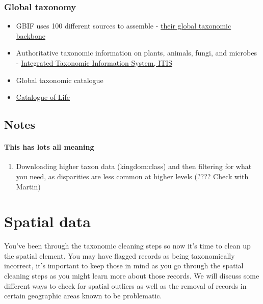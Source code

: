 \documentclass[
  letterpaper,
  DIV=11,
  numbers=noendperiod,
  oneside]{scrreprt}
\providecommand{\tightlist}{%
  \setlength{\itemsep}{0pt}\setlength{\parskip}{0pt}}\usepackage{longtable,booktabs,array}
\begin{document}
\hypertarget{global-taxonomy}{%
\subsection{Global taxonomy}\label{global-taxonomy}}

\begin{itemize}
\item
  GBIF uses 100 different sources to assemble -
  \href{https://www.gbif.org/dataset/d7dddbf4-2cf0-4f39-9b2a-bb099caae36c}{their
  global taxonomic backbone}
\item
  Authoritative taxonomic information on plants, animals, fungi, and
  microbes - \href{https://www.itis.gov/}{Integrated Taxonomic
  Information System, ITIS}
\item
  Global taxonomic catalogue
\item
  \href{https://www.catalogueoflife.org/}{Catalogue of Life}
\end{itemize}

\hypertarget{notes}{%
\section{Notes}\label{notes}}

\hypertarget{this-has-lots-all-meaning}{%
\subsubsection{This has lots all
meaning}\label{this-has-lots-all-meaning}}

\begin{enumerate}
\def\labelenumi{\arabic{enumi}.}
\tightlist
\item
  Downloading higher taxon data (kingdom:class) and then filtering for
  what you need, as disparities are less common at higher levels (????
  Check with Martin)
\end{enumerate}


\hypertarget{sec-spatial}{%
\chapter{Spatial data}\label{sec-spatial}}

You've been through the taxonomic cleaning steps so now it's time to
clean up the spatial element. You may have flagged records as being
taxonomically incorrect, it's important to keep those in mind as you go
through the spatial cleaning steps as you might learn more about those
records. We will discuss some different ways to check for spatial
outliers as well as the removal of records in certain geographic areas
known to be problematic.
\end{document}
